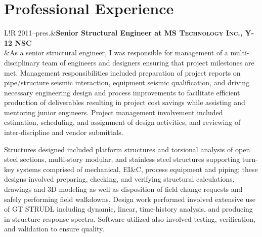 \documentclass[11pt,letterpaper]{article}
\newcommand\VRule{\color{lightgray}\vrule width 0.5pt}
\begin{document}
\section*{Professional Experience}
\begin{tabular}{L!{\VRule}R}
2011--pres.&{\bf Senior Structural Engineer at \fontsize{12}{12}\textsc{MS Technology Inc., Y-12 NSC}}\\
&As a senior structural engineer, I was responsible for management of a multi-disciplinary team of engineers and designers ensuring that project milestones are met.  Management responsibilities included preparation of project reports on pipe/structure seismic interaction, equipment seismic qualification, and driving necessary engineering design and process improvements to facilitate efficient production of deliverables resulting in project cost savings while assisting and mentoring junior engineers.  Project management involvement included estimation, scheduling, and assignment of design activities, and reviewing of inter-discipline and vendor submittals.  

\par
Structures designed included platform structures and torsional analysis of open steel sections, multi-story modular, and stainless steel structures supporting turn-key systems comprised of mechanical, EI\&C, process equipment and piping; these designs involved preparing, checking, and verifying structural calculations, drawings and 3D modeling as well as disposition of field change requests and safely performing field walkdowns.   Design work performed involved extensive use of GT STRUDL including dynamic, linear, time-history analysis, and producing in-structure response spectra.  Software utilized also involved testing, verification, and validation to ensure quality.
\\[6pt]
\par\vspace{0.3em} 
\end{tabular}
\end{document}
